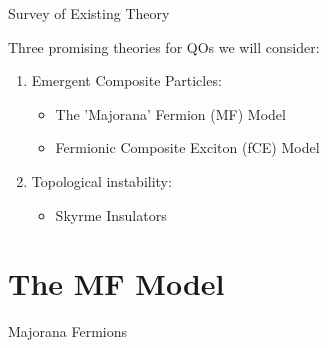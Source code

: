 \documentclass{beamer}
\begin{document}


\begin{frame}{Survey of Existing Theory}


    
    Three promising theories for QOs we will consider:
        \begin{enumerate}
            \item Emergent Composite Particles:
                \begin{itemize}
                    \item The 'Majorana' Fermion (MF) Model \cite{coleman1993, coleman1994}
                    \item Fermionic Composite Exciton (fCE) Model \cite{chowdhury2018}
                \end{itemize}
    
            \item Topological instability:
                \begin{itemize}
                    \item Skyrme Insulators \cite{coleman2017}
                \end{itemize}
        \end{enumerate}
    

\end{frame}


\section{The MF Model}


\begin{frame}
    
    \centering Majorana Fermions

\end{frame}


\end{document}
